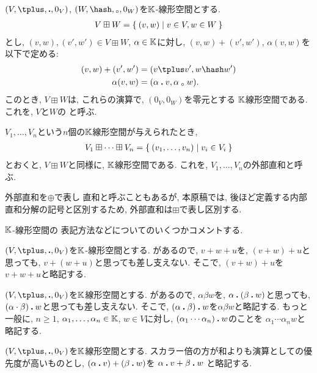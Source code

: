 \begin{example}
  $(V,\plus,\act,0_V)$, $(W,\pplus,\aact,0_W)$を$\mathbb{K}$-線形空間とする.
\begin{align*}
V\boxplus W = \Set{(v,w)|v\in V, w\in W}
\end{align*}
とし, $(v,w),(v',w')\in V\boxplus W$, $\alpha\in\mathbb{K}$に対し,
$(v,w)+(v',w')$, $\alpha(v,w)$を以下で定める:
\begin{align*}
(v,w)+(v',w')&=(v\plus v', w\pplus w')\\
\alpha(v,w)&=(\alpha\act v,\alpha\aact w).
\end{align*}
このとき,
$V\boxplus W$は, これらの演算で, $(0_V,0_W)$を零元とする
$\mathbb{K}$線形空間である.
これを,
$V$と$W$の
%
%
と呼ぶ.

$V_1,\ldots, V_n$という$n$個の$\mathbb{K}$線形空間が与えられたとき,
\begin{align*}
V_1\boxplus \cdots \boxplus V_n = \Set{(v_1,\ldots,v_n)|v_i\in V_i}
\end{align*}
とおくと,
$V\boxplus W$と同様に,
$\mathbb{K}$線形空間である.
これを, 
$V_1,\ldots, V_n$の外部直和と呼ぶ.
\end{example}
\begin{remark}
外部直和を$\oplus$で表し
直和と呼ぶこともあるが,
本原稿では,
後ほど定義する内部直和分解の記号と区別するため,
外部直和は$\boxplus$で表し区別する.
\end{remark}

$\mathbb{K}$-線形空間の
表記方法などについてのいくつかコメントする.
\begin{remark}
$(V,\plus,\act,0_V)$を$\mathbb{K}$-線形空間とする.
があるので, $v\plus w\plus u$を, $(v\plus w)\plus u$と思っても,
$v\plus (w\plus u)$と思っても差し支えない.
そこで, $(v\plus w)\plus u$を$v\plus w\plus u$と略記する.
\end{remark}
\begin{remark}
$(V,\plus,\act,0_V)$を$\mathbb{K}$線形空間とする.
があるので, $\alpha \beta w$を, $\alpha\mathbin{\boldsymbol{.}} (\beta\mathbin{\boldsymbol{.}} w)$と思っても,
$(\alpha\cdot\beta)\mathbin{\boldsymbol{.}} w$と思っても差し支えない.
そこで, $(\alpha\mathbin{\boldsymbol{.}} \beta)\mathbin{\boldsymbol{.}} w$を$\alpha \beta w$と略記する.
もっと一般に, $n\geq 1$, $\alpha_1,\ldots,\alpha_n\in\mathbb{K}$, $w\in V$に対し,
$(\alpha_1\cdots \alpha_n)\mathbin{\boldsymbol{.}} w$のことを
$\alpha_1\cdots \alpha_n w$と略記する.
\end{remark}
\begin{remark}
$(V,\plus,\act,0_V)$を$\mathbb{K}$線形空間とする.
スカラー倍の方が和よりも演算としての優先度が高いものとし,
$(\alpha\mathbin{\boldsymbol{.}} v)+(\beta\mathbin{\boldsymbol{.}} w)$を
$\alpha\mathbin{\boldsymbol{.}} v+\beta\mathbin{\boldsymbol{.}} w$
と略記する.
\end{remark}

